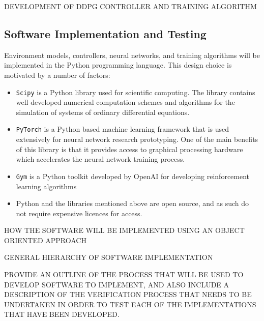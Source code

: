 DEVELOPMENT OF DDPG CONTROLLER AND TRAINING ALGORITHM

\subsection{Software Implementation and Testing}
Environment models, controllers, neural networks, and training algorithms will be implemented in the Python programming language. This design choice is motivated by a number of factors:
\begin{itemize}
	\item \texttt{Scipy} is a Python library used for scientific computing. The library contains well developed numerical computation schemes and algorithms for the simulation of systems of ordinary differential equations.
	\item \texttt{PyTorch} is a Python based machine learning framework that is used extensively for neural network research prototyping. One of the main benefits of this library is that it provides access to graphical processing hardware which accelerates the neural network training process.
	\item \texttt{Gym} is a Python toolkit developed by OpenAI for developing reinforcement learning algorithms
	\item Python and the libraries mentioned above are open source, and as such do not require expensive licences for access.
\end{itemize}

HOW THE SOFTWARE WILL BE IMPLEMENTED USING AN OBJECT ORIENTED APPROACH

GENERAL HIERARCHY OF SOFTWARE IMPLEMENTATION

PROVIDE AN OUTLINE OF THE PROCESS THAT WILL BE USED TO DEVELOP SOFTWARE TO IMPLEMENT, AND ALSO INCLUDE A DESCRIPTION OF THE VERIFICATION PROCESS THAT NEEDS TO BE UNDERTAKEN IN ORDER TO TEST EACH OF THE IMPLEMENTATIONS THAT HAVE BEEN DEVELOPED.